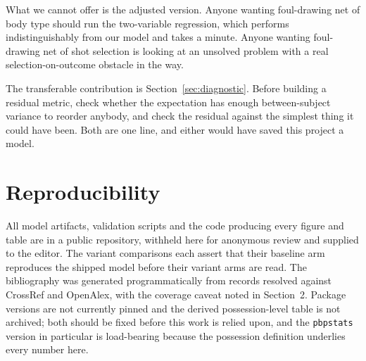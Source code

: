 \documentclass[11pt,letterpaper]{article}
\begin{document}
What we cannot offer is the adjusted version. Anyone wanting foul-drawing net of
body type should run the two-variable regression, which performs
indistinguishably from our model and takes a minute. Anyone wanting foul-drawing
net of shot selection is looking at an unsolved problem with a real
selection-on-outcome obstacle in the way.

The transferable contribution is Section~\ref{sec:diagnostic}. Before building a
residual metric, check whether the expectation has enough between-subject variance
to reorder anybody, and check the residual against the simplest thing it could
have been. Both are one line, and either would have saved this project a model.

\section*{Reproducibility}

All model artifacts, validation scripts and the code producing every figure and
table are in a public repository, withheld here for anonymous review and
supplied to the editor. The variant comparisons each
assert that their baseline arm reproduces the shipped model before their variant
arms are read. The bibliography was generated programmatically from records
resolved against CrossRef and OpenAlex, with the coverage caveat noted in
Section~2. Package versions are not currently pinned and the derived
possession-level table is not archived; both should be fixed before this work is
relied upon, and the \texttt{pbpstats} version in particular is load-bearing
because the possession definition underlies every number here.


\end{document}
